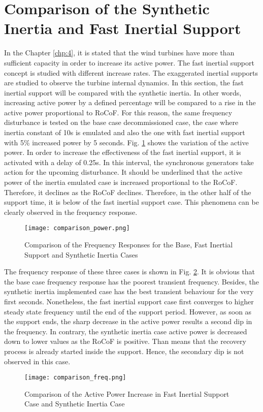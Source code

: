 \section{Comparison of the Synthetic Inertia and Fast Inertial Support}
In the Chapter \ref{chp:4}, it is stated that the wind turbines have more than sufficient capacity in order to increase its active power. The fast inertial support concept is studied with different increase rates. The exaggerated inertial supports are studied to observe the turbine internal dynamics. In this section, the fast inertial support will be compared with the synthetic inertia. In other words, increasing active power by a defined percentage will be compared to a rise in the active power proportional to RoCoF. For this reason, the same frequency disturbance is tested on the base case decommissioned case, the case where inertia constant of 10s is emulated and also the one with fast inertial support with 5\% increased power by 5 seconds. Fig. \ref{Comp_power} shows the variation of the active power. In order to increase the effectiveness of the fast inertial support, it is activated with a delay of 0.25s. In this interval, the synchronous generators take action for the upcoming disturbance. It should be underlined that the active power of the inertia emulated case is increased proportional to the RoCoF. Therefore, it declines as the RoCoF declines. Therefore, in the other half of the support time, it is below of the fast inertial support case. This phenomena can be clearly observed in the frequency response.\par
\begin{figure}[h]
	\centering
	\texttt{[image: comparison\_power.png]}
	\caption{Comparison of the Frequency Responses for the Base, Fast Inertial Support and Synthetic Inertia Cases}
	\label{Comp_power}
\end{figure}
The frequency response of these three cases is shown in Fig. \ref{Comp_freq}. It is obvious that the base case frequency response has the poorest transient frequency. Besides, the synthetic inertia implemented case has the best transient behaviour for the very first seconds. Nonetheless, the fast inertial support case first converges to higher steady state frequency until the end of the support period. However, as soon as the support ends, the sharp decrease in the active power results a second dip in the frequency. In contrary, the synthetic inertia case active power is decreased down to lower values as the RoCoF is positive. Than means that the recovery process is already started inside the support. Hence, the secondary dip is not observed in this case. 
\begin{figure}[h!]
	\centering
	\texttt{[image: comparison\_freq.png]}
	\caption{Comparison of the Active Power Increase in Fast Inertial Support Case and Synthetic Inertia Case}
	\label{Comp_freq}
\end{figure}
